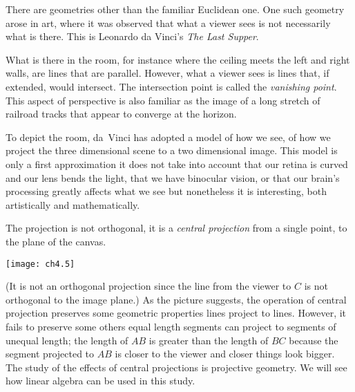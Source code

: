 There are geometries other than the familiar Euclidean one.
One such geometry arose in art, where it was observed
that what a viewer sees is not necessarily what is there.
This is Leonardo da Vinci's 
\emph{The Last Supper}.
\begin{center} 
\end{center}
What is there in the room, 
for instance where the ceiling meets the left and right walls,
are lines that are parallel. 
However, what a viewer sees
is lines that, if extended, would intersect.
The intersection point is called the \emph{vanishing point}.
%
This aspect of perspective is also familiar as the image of a long stretch of 
railroad tracks that appear to converge at the horizon.

To depict the room, da~Vinci has adopted a model of how we see, of how
we project the three dimensional scene to a two dimensional image.
This model is only a first approximation \Dash  it does not take into
account that our retina is curved and our lens bends the light,
that we have binocular vision, or that our brain's processing 
greatly affects what we see \Dash  but nonetheless it is interesting,
both artistically and mathematically.

The projection is not orthogonal, it is a 
\emph{central projection} 
from a single point, to the plane of the canvas.  
\begin{center}
  \texttt{[image: ch4.5]}
\end{center}
(It is not an orthogonal projection since the line
from the viewer to $C$ is not orthogonal to the image plane.)
As the picture suggests, the operation of  
central projection preserves some geometric 
properties \Dash  lines project to lines.
However, it fails to preserve some others \Dash  equal 
length segments can project to segments of unequal length; 
the length of $AB$ is greater than the length of $BC$ because the
segment projected to $AB$ is closer to the viewer and 
closer things look bigger.
The study of the effects of central projections is projective geometry.
We will see how linear algebra can be used in this study.

